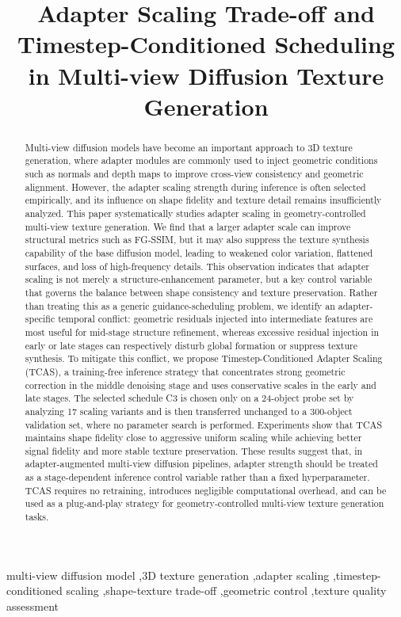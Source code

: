 \documentclass[times,twocolumn,final]{elsarticle}
\begin{document}
\begin{frontmatter}

\title{Adapter Scaling Trade-off and Timestep-Conditioned Scheduling in Multi-view Diffusion Texture Generation}

\author{}

\begin{abstract}
Multi-view diffusion models have become an important approach to 3D texture generation, where adapter modules are commonly used to inject geometric conditions such as normals and depth maps to improve cross-view consistency and geometric alignment. However, the adapter scaling strength during inference is often selected empirically, and its influence on shape fidelity and texture detail remains insufficiently analyzed. This paper systematically studies adapter scaling in geometry-controlled multi-view texture generation. We find that a larger adapter scale can improve structural metrics such as FG-SSIM, but it may also suppress the texture synthesis capability of the base diffusion model, leading to weakened color variation, flattened surfaces, and loss of high-frequency details. This observation indicates that adapter scaling is not merely a structure-enhancement parameter, but a key control variable that governs the balance between shape consistency and texture preservation. Rather than treating this as a generic guidance-scheduling problem, we identify an adapter-specific temporal conflict: geometric residuals injected into intermediate features are most useful for mid-stage structure refinement, whereas excessive residual injection in early or late stages can respectively disturb global formation or suppress texture synthesis. To mitigate this conflict, we propose Timestep-Conditioned Adapter Scaling (TCAS), a training-free inference strategy that concentrates strong geometric correction in the middle denoising stage and uses conservative scales in the early and late stages. The selected schedule C3 is chosen only on a 24-object probe set by analyzing 17 scaling variants and is then transferred unchanged to a 300-object validation set, where no parameter search is performed. Experiments show that TCAS maintains shape fidelity close to aggressive uniform scaling while achieving better signal fidelity and more stable texture preservation. These results suggest that, in adapter-augmented multi-view diffusion pipelines, adapter strength should be treated as a stage-dependent inference control variable rather than a fixed hyperparameter. TCAS requires no retraining, introduces negligible computational overhead, and can be used as a plug-and-play strategy for geometry-controlled multi-view texture generation tasks.
\end{abstract}

\begin{keyword}
\KWD
multi-view diffusion model \sep 3D texture generation \sep adapter scaling \sep timestep-conditioned scaling \sep shape-texture trade-off \sep geometric control \sep texture quality assessment
\end{keyword}

\end{frontmatter}
\end{document}
